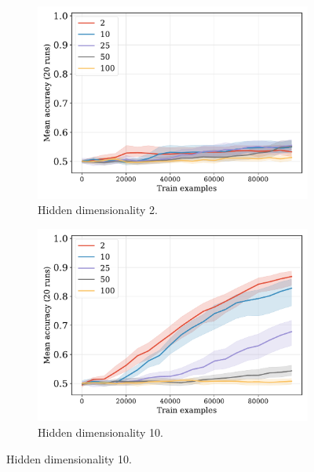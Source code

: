 \documentclass[12pt]{article}
\begin{document}
\begin{figure}[H]
  \centering

  \begin{subfigure}{0.45\linewidth}
    \includegraphics[width=1\textwidth]{fig/flatpremack-h1-train_size-embed_dim-hidden_dim=2.pdf}
    \caption{Hidden dimensionality 2.}
  \end{subfigure}
  \hfill
  \begin{subfigure}{0.45\linewidth}
    \includegraphics[width=1\textwidth]{fig/flatpremack-h1-train_size-embed_dim-hidden_dim=10.pdf}
    \caption{Hidden dimensionality 10.}
  \end{subfigure}


\end{figure}
\end{document}

